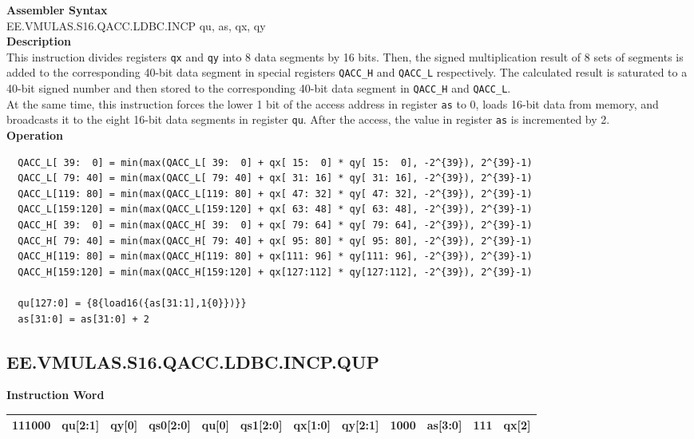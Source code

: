 \textbf{Assembler Syntax} \\
EE.VMULAS.S16.QACC.LDBC.INCP qu, as, qx, qy \\
\textbf{Description} \\
This instruction divides registers \lstinline{qx} and \lstinline{qy} into 8 data segments by 16 bits. Then, the signed multiplication result of 8 sets of segments is added to the corresponding 40-bit data segment in special registers \lstinline{QACC_H} and \lstinline{QACC_L} respectively. The calculated result is saturated to a 40-bit signed number and then stored to the corresponding 40-bit data segment in \lstinline{QACC_H} and \lstinline{QACC_L}.\\
At the same time, this instruction forces the lower 1 bit of the access address in register \lstinline{as} to 0, loads 16-bit data from memory, and broadcasts it to the eight 16-bit data segments in register \lstinline{qu}. After the access, the value in register \lstinline{as} is incremented by 2.\\
\textbf{Operation}
\begin{lstlisting}
  QACC_L[ 39:  0] = min(max(QACC_L[ 39:  0] + qx[ 15:  0] * qy[ 15:  0], -2^{39}), 2^{39}-1)
  QACC_L[ 79: 40] = min(max(QACC_L[ 79: 40] + qx[ 31: 16] * qy[ 31: 16], -2^{39}), 2^{39}-1)
  QACC_L[119: 80] = min(max(QACC_L[119: 80] + qx[ 47: 32] * qy[ 47: 32], -2^{39}), 2^{39}-1)
  QACC_L[159:120] = min(max(QACC_L[159:120] + qx[ 63: 48] * qy[ 63: 48], -2^{39}), 2^{39}-1)
  QACC_H[ 39:  0] = min(max(QACC_H[ 39:  0] + qx[ 79: 64] * qy[ 79: 64], -2^{39}), 2^{39}-1)
  QACC_H[ 79: 40] = min(max(QACC_H[ 79: 40] + qx[ 95: 80] * qy[ 95: 80], -2^{39}), 2^{39}-1)
  QACC_H[119: 80] = min(max(QACC_H[119: 80] + qx[111: 96] * qy[111: 96], -2^{39}), 2^{39}-1)
  QACC_H[159:120] = min(max(QACC_H[159:120] + qx[127:112] * qy[127:112], -2^{39}), 2^{39}-1)

  qu[127:0] = {8{load16({as[31:1],1{0}})}}
  as[31:0] = as[31:0] + 2
\end{lstlisting}

\clearpage
\subsection{EE.VMULAS.S16.QACC.LDBC.INCP.QUP}\label{instruction:EEVMULASS16QACCLDBCINCPQUP}
\setlength\tabcolsep{6pt}
\textbf{Instruction Word} \\
\begin{tabular}{|c|c|c|c|c|c|c|c|c|c|c|c|}
	\hline
	111000 & qu[2:1] & qy[0] & qs0[2:0] & qu[0] & qs1[2:0] & qx[1:0] & qy[2:1] & 1000 & as[3:0] & 111 & qx[2] \\
	\hline
\end{tabular}

